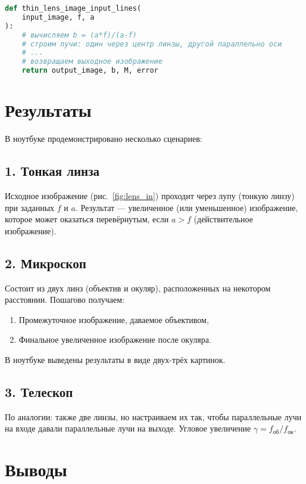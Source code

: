\documentclass[a4paper,12pt]{article}
\begin{document}
\begin{lstlisting}[language=Python, basicstyle=\small]
def thin_lens_image_input_lines(
    input_image, f, a
):
    # вычисляем b = (a*f)/(a-f)
    # строим лучи: один через центр линзы, другой параллельно оси
    # ...
    # возвращаем выходное изображение
    return output_image, b, M, error
\end{lstlisting}

\section{Результаты}

В ноутбуке продемонстрировано несколько сценариев:

\subsection{1. Тонкая линза}

Исходное изображение (рис.~\ref{fig:lens_in}) проходит через лупу (тонкую линзу) при заданных $f$ и $a$. Результат --- увеличенное (или уменьшенное) изображение, которое может оказаться перевёрнутым, если $a>f$ (действительное изображение).

\subsection{2. Микроскоп}

Состоит из двух линз (объектив и окуляр), расположенных на некотором расстоянии. Пошагово получаем:
\begin{enumerate}
  \item Промежуточное изображение, даваемое объективом,
  \item Финальное увеличенное изображение после окуляра.
\end{enumerate}
В ноутбуке выведены результаты в виде двух-трёх картинок.

\subsection{3. Телескоп}

По аналогии: также две линзы, но настраиваем их так, чтобы параллельные лучи на входе давали параллельные лучи на выходе. Угловое увеличение $\gamma = f_{\text{об}} / f_{\text{ок}}$.

\section{Выводы}
\end{document}
